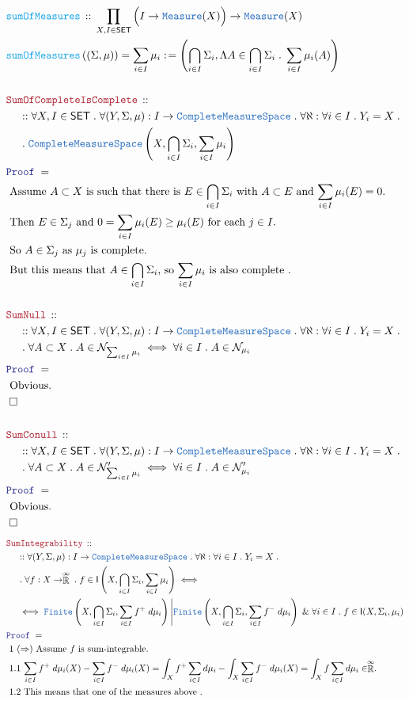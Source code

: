 \documentclass[12pt]{scrartcl}
\newcommand{\TYPE}[1]{\textcolor{NavyBlue}{\mathtt{#1}}}
\newcommand{\FUNC}[1]{\textcolor{Cerulean}{\mathtt{#1}}}
\newcommand{\LOGIC}[1]{\textcolor{Blue}{\mathtt{#1}}}
\newcommand{\THM}[1]{\textcolor{Maroon}{\mathtt{#1}}}
\renewcommand{\.}{\; . \;}
\newcommand{\de}{: \kern 0.1pc =}
\newcommand{\Act}[1]{\left( #1 \right)}
\newcommand{\Theorem}[2]{& \THM{#1} \, :: \, #2 \\ & \Proof = \\ }
\newcommand{\DeclareFunc}[2]{& \FUNC{#1} \, :: \, #2 \\}
\newcommand{\DefineNamedFunc}[4]{&  \FUNC{#1}\Act{#2} = #3 \de #4 \\}
\newcommand{\NewLine}{\\ & \kern 1pc}
\newcommand{\Page}[1]{ \begin{align*} #1 \end{align*}   }
\renewcommand{\And}{\; \& \;}
\newcommand{\EReals}{\stackrel{\mathclap{\infty}}{\mathbb{R}}}
\newcommand{\QED}{\; \square}
\newcommand{\EndProof}{& \QED \\}
\newcommand{\Proof}{\LOGIC{Proof} \; }
\newcommand{\Explain}[1]{& \text{#1.} \\}
\newcommand{\Finite}{\TYPE{Finite}}
\newcommand{\SET}{\mathsf{SET}}
\newcommand{\Measure}{\TYPE{Measure}}
\newcommand{\CMS}{\TYPE{CompleteMeasureSpace}}
\newcommand{\Null}{\mathcal{N}}
\newcommand{\Integrable}{\mathsf{I}}
\begin{document}
\Page{
	\DeclareFunc{sumOfMeasures}
	{
		\prod_{X,I \in \SET}  \Big(I \to \Measure(X)\Big) \to \Measure(X)
	}
	\DefineNamedFunc{sumOfMeasures}{(\Sigma,\mu)}{\sum_{i \in I} \mu_i}
	{\left(  \bigcap_{i \in I} \Sigma_i, \Lambda A \in \bigcap_{i \in I} \Sigma_i \. 
			\sum_{i \in I} \mu_i(A)	\right)
	}
	\\
	\Theorem{SumOfCompleteIsComplete}
	{
		\NewLine ::		
		\forall X,I \in \SET \.
		\forall (Y,\Sigma,\mu) : I \to \CMS \.
		\forall \aleph : \forall i \in I \. Y_i = X \. \NewLine \. 
		\CMS\left( X, \bigcap_{i \in I} \Sigma_i, \sum_{i \in I} \mu_i   \right)
	}
	\Explain{ Assume $A \subset X$ is such that there is 
		$E \in \bigcap_{i \in I} \Sigma_i$ with $A \subset E$ and $\sum_{i \in I}\mu_i(E) = 0$}
	\Explain{ Then $E \in \Sigma_j$ and $0 = \sum_{i \in I}\mu_i(E) \ge  \mu_i(E)$ for each $j \in I$}
	\Explain{ So $A \in \Sigma_j$ as $\mu_j$ is complete}
	\Explain{ But this means that $A \in \bigcap_{i \in I} \Sigma_i$, so $\sum_{i \in I} \mu_i$ 
		is also complete }
	\\
	\Theorem{SumNull}
	{
		\NewLine ::
		\forall X,I \in \SET \.
		\forall (Y,\Sigma,\mu) : I \to \CMS \.
		\forall \aleph : \forall i \in I \. Y_i = X \. \NewLine \. 
		\forall A \subset X \. 
		A \in \Null_{\sum_{i \in I} \mu_i}
		\iff
		\forall i \in I \. A \in \Null_{\mu_i} 
	}
	\Explain{ Obvious}
	\EndProof
	\\
	\Theorem{SumConull}
	{
		\NewLine ::
		\forall X,I \in \SET \.
		\forall (Y,\Sigma,\mu) : I \to \CMS \.
		\forall \aleph : \forall i \in I \. Y_i = X \. \NewLine \. 
		\forall A \subset X \. 
		A \in \Null_{\sum_{i \in I} \mu_i}'
		\iff
		\forall i \in I \. A \in \Null_{\mu_i}' 
	}
	\Explain{ Obvious}
	\EndProof
}\Page{
	\Theorem{SumIntegrability}
	{
		\NewLine ::
		\forall (Y,\Sigma,\mu) : I \to \CMS \.
		\forall \aleph : \forall i \in I \. Y_i = X \. \NewLine \. 
		\forall f : X \to \EReals \.
		f \in  \Integrable\left( X, \bigcap_{i \in I } \Sigma_i, \sum_{i\in I} \mu_i \right)
		\iff \NewLine \iff 
		\Finite\left( X, \bigcap_{i \in I } \Sigma_i, \sum_{i\in I} f^+ \; d\mu_i \right) \Bigg|
		\Finite\left( X, \bigcap_{i \in I } \Sigma_i, \sum_{i\in I} f^- \; d\mu_i \right)
		\And 
		\forall i \in I \. f \in \Integrable(X,\Sigma_i,\mu_i)
	}
	\Explain{ 1 $(\Rightarrow)$ Assume $f$ is sum-integrable}
	\Explain{ 1.1 $\sum_{i\in I} f^+ \; d\mu_i(X) - \sum_{i\in I} f^- \; d\mu_i(X) = 
		 \int_X f^+ \sum_{i \in I } d\mu_i  - \int_X   \sum_{i\in I} f^- \; d\mu_i(X) =
		 \int_X f \sum_{i \in I } d\mu_i  \in \EReals	 
		 $}
	\Explain{ 1.2 This means that one of the measures above
}}
\end{document}
